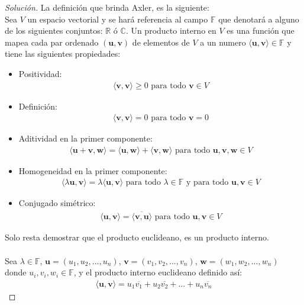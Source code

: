 \documentclass[12pt]{book}
\newcommand{\C}{\mathbb{C}}
\newcommand{\R}{\mathbb{R}}
\newcommand{\F}{\mathbb{F}}
\newcommand{\todo}{\textrm{ para todo }}
\newenvironment{solucion}
  {\renewcommand\qedsymbol{$\square$}\begin{proof}[Solución]}
  {\end{proof}}
\begin{document}
\begin{solucion}
La definición que brinda Axler, es la siguiente:\\
Sea $V$ un espacio vectorial y se hará referencia al campo $\F$ que denotará a alguno de los siguientes conjuntos: $\R$ ó $\C$.
Un producto interno en $V$ es una función que mapea cada par ordenado $(\textbf{u},\textbf{v})$ de elementos de $V$ a un numero 	$\langle \textbf{u},\textbf{v} \rangle \in \F$ y tiene las siguientes propiedades:

\begin{itemize}
    \item Positividad: 
    \begin{align*}
        \langle \textbf{v},\textbf{v} \rangle \geq 0 \todo  \textbf{v} \in V
    \end{align*}
    
    \item Definición: 
    \begin{align*}
        \langle \textbf{v},\textbf{v} \rangle=0 \todo\textbf{v} = 0
    \end{align*}
    \item  Aditividad en la primer componente: 
    \begin{align*}
        \langle \textbf{u}+\textbf{v},\textbf{w} \rangle =\langle \textbf{u},\textbf{w} \rangle + \langle \textbf{v},\textbf{w} \rangle\todo\textbf{u},\textbf{v},\textbf{w} \in V
    \end{align*}
    
    \item  Homogeneidad en la primer componente: 
    \begin{align*}
        \langle \lambda\textbf{u},\textbf{v} \rangle =\lambda\langle \textbf{u},\textbf{v} \rangle \todo\lambda \in \F\textrm{ y}\todo\textbf{u},\textbf{v} \in V
    \end{align*}
    
    \item  Conjugado simétrico: 
    \begin{align*}
        \langle \textbf{u},\textbf{v} \rangle =\overline{\langle \textbf{v},\textbf{u} \rangle}\todo\textbf{u},\textbf{v} \in V
    \end{align*}
     
\end{itemize}
Solo resta demostrar que el producto euclideano, es un producto interno.\\ \\
Sea $\lambda \in \F$, $\textbf{u}=(u_{1},u_{2},...,u_{n})$, $\textbf{v}=(v_{1},v_{2},...,v_{n})$, $\textbf{w}=(w_{1},w_{2},...,w_{n})$ donde $u_i,v_i,w_i \in \F$,  y el producto interno euclideano definido así: 
\begin{align*}
    \langle \textbf{u},\textbf{v} \rangle=u_1\overline{v_1}+u_2\overline{v_2}+...+u_n\overline{v_n}    
\end{align*}
 

\end{solucion}
\end{document}
